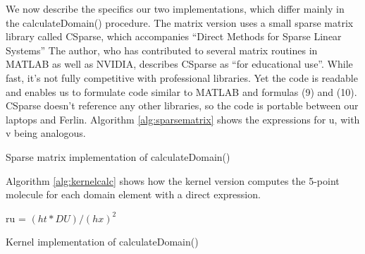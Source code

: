 \documentclass[a4paper,11pt]{article}
\begin{document}
We now describe the specifics our two implementations, which differ mainly in the calculateDomain() procedure. The matrix version uses a small sparse matrix library called CSparse, which accompanies ``Direct Methods for Sparse Linear Systems'' 
The author, who has contributed to several matrix routines in MATLAB as well as NVIDIA, describes CSparse as ``for educational use''. While fast, it's not fully competitive with professional libraries. Yet the code is readable and enables us to formulate code similar to MATLAB and formulas (9) and (10). CSparse doesn't reference any other libraries, so the code is portable between our laptops and Ferlin. Algorithm \ref{alg:sparsematrix} shows the expressions for u, with v being analogous. 

\vspace{0.7 cm}
\begin{algorithm}[H]
\label{alg:sparsematrix}
  \SetAlgoLined
  \caption{Sparse matrix implementation of calculateDomain()}
\end{algorithm}
\vspace{0.7 cm}



Algorithm \ref{alg:kernelcalc} shows how the kernel version computes the 5-point molecule for each domain element with a direct expression.

\vspace{0.7 cm}
\begin{algorithm}[H]
\label{alg:kernelcalc}
  \SetAlgoLined
  ru = $(ht * DU) / (hx)^2$\;

  \caption{Kernel implementation of calculateDomain()}
\end{algorithm}
\vspace{0.7 cm}
\end{document}
